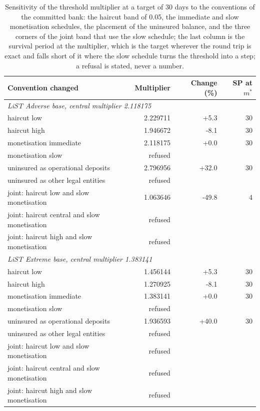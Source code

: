 \begin{table}[htbp]
\centering
\small
\setlength{\tabcolsep}{3pt}
\caption{Sensitivity of the threshold multiplier at a target of 30 days to the conventions of the committed bank: the haircut band of 0.05, the immediate and slow monetisation schedules, the placement of the uninsured balance, and the three corners of the joint band that use the slow schedule; the last column is the survival period at the multiplier, which is the target wherever the round trip is exact and falls short of it where the slow schedule turns the threshold into a step; a refusal is stated, never a number.}
\label{tab:band}
\begin{tabular}{lrrr}
\toprule
Convention changed & Multiplier & Change (\%) & SP at $m^\ast$ \\
\midrule
\multicolumn{4}{l}{\textit{LiST Adverse base, central multiplier 2.118175}} \\
haircut low & 2.229711 & +5.3 & 30 \\
haircut high & 1.946672 & -8.1 & 30 \\
monetisation immediate & 2.118175 & +0.0 & 30 \\
monetisation slow & refused & & \\
uninsured as operational deposits & 2.796956 & +32.0 & 30 \\
uninsured as other legal entities & refused & & \\
joint: haircut low and slow monetisation & 1.063646 & -49.8 & 4 \\
joint: haircut central and slow monetisation & refused & & \\
joint: haircut high and slow monetisation & refused & & \\
\multicolumn{4}{l}{\textit{LiST Extreme base, central multiplier 1.383141}} \\
haircut low & 1.456144 & +5.3 & 30 \\
haircut high & 1.270925 & -8.1 & 30 \\
monetisation immediate & 1.383141 & +0.0 & 30 \\
monetisation slow & refused & & \\
uninsured as operational deposits & 1.936593 & +40.0 & 30 \\
uninsured as other legal entities & refused & & \\
joint: haircut low and slow monetisation & refused & & \\
joint: haircut central and slow monetisation & refused & & \\
joint: haircut high and slow monetisation & refused & & \\
\bottomrule
\end{tabular}
\end{table}
